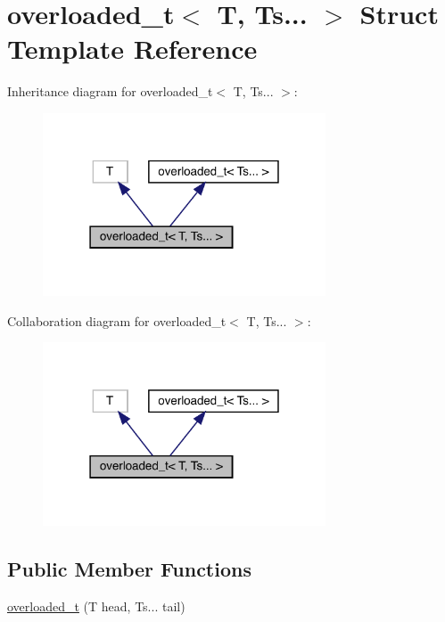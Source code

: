 \hypertarget{structoverloaded__t_3_01_t_00_01_ts_8_8_8_01_4}{}\section{overloaded\+\_\+t$<$ T, Ts... $>$ Struct Template Reference}
\label{structoverloaded__t_3_01_t_00_01_ts_8_8_8_01_4}


Inheritance diagram for overloaded\+\_\+t$<$ T, Ts... $>$\+:
\nopagebreak
\begin{figure}[H]
\begin{center}
\leavevmode
\includegraphics[width=238pt]{structoverloaded__t_3_01_t_00_01_ts_8_8_8_01_4__inherit__graph}
\end{center}
\end{figure}


Collaboration diagram for overloaded\+\_\+t$<$ T, Ts... $>$\+:
\nopagebreak
\begin{figure}[H]
\begin{center}
\leavevmode
\includegraphics[width=238pt]{structoverloaded__t_3_01_t_00_01_ts_8_8_8_01_4__coll__graph}
\end{center}
\end{figure}
\subsection*{Public Member Functions}
\begin{DoxyCompactItemize}
\item 
\hyperlink{structoverloaded__t_3_01_t_00_01_ts_8_8_8_01_4_a72b691d04beb46c5843195c37aa41bf8}{overloaded\+\_\+t} (T head, Ts... tail)
\end{DoxyCompactItemize}


